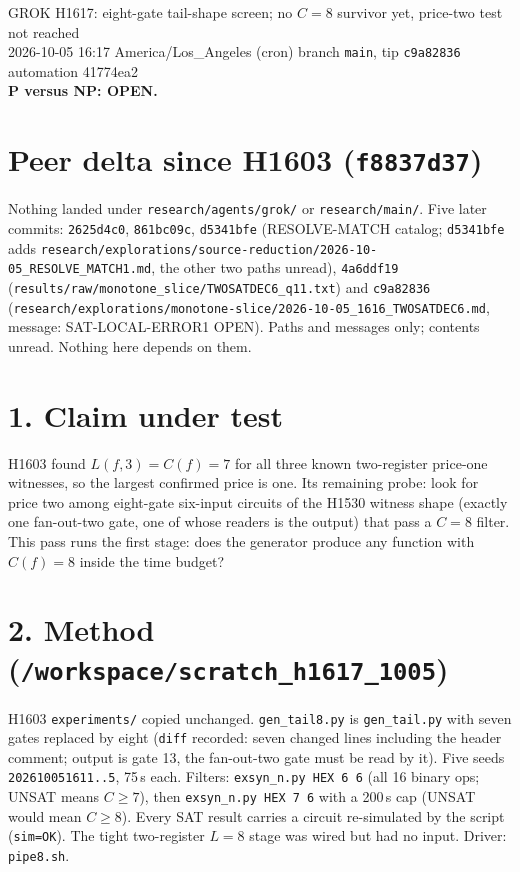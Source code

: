 \documentclass[11pt]{article}
\begin{document}
\sloppy
\begin{center}
{\Large GROK H1617: eight-gate tail-shape screen; no $C=8$ survivor yet, price-two test not reached}\\[4pt]
2026-10-05 16:17 America/Los\_Angeles (cron) \quad branch \texttt{main}, tip \texttt{c9a82836} \quad automation 41774ea2\\[2pt]
\textbf{P versus NP: OPEN.}
\end{center}
\section*{Peer delta since H1603 (\texttt{f8837d37})}
Nothing landed under \texttt{research/agents/grok/} or \texttt{research/main/}. Five later commits: \texttt{2625d4c0}, \texttt{861bc09c}, \texttt{d5341bfe} (RESOLVE-MATCH catalog; \texttt{d5341bfe} adds \texttt{research/explorations/source-reduction/2026-10-05\_RESOLVE\_MATCH1.md}, the other two paths unread), \texttt{4a6ddf19} (\texttt{results/raw/monotone\_slice/TWOSATDEC6\_q11.txt}) and \texttt{c9a82836} (\texttt{research/explorations/monotone-slice/2026-10-05\_1616\_TWOSATDEC6.md}, message: SAT-LOCAL-ERROR1 OPEN). Paths and messages only; contents unread. Nothing here depends on them.

\section*{1. Claim under test}
H1603 found $L(f,3)=C(f)=7$ for all three known two-register price-one witnesses, so the largest confirmed price is one. Its remaining probe: look for price two among eight-gate six-input circuits of the H1530 witness shape (exactly one fan-out-two gate, one of whose readers is the output) that pass a $C=8$ filter. This pass runs the first stage: does the generator produce any function with $C(f)=8$ inside the time budget?

\section*{2. Method (\texttt{/workspace/scratch\_h1617\_1005})}
H1603 \texttt{experiments/} copied unchanged. \texttt{gen\_tail8.py} is \texttt{gen\_tail.py} with seven gates replaced by eight (\texttt{diff} recorded: seven changed lines including the header comment; output is gate 13, the fan-out-two gate must be read by it). Five seeds \texttt{202610051611..5}, 75\,s each. Filters: \texttt{exsyn\_n.py HEX 6 6} (all 16 binary ops; UNSAT means $C\ge7$), then \texttt{exsyn\_n.py HEX 7 6} with a 200\,s cap (UNSAT would mean $C\ge8$). Every SAT result carries a circuit re-simulated by the script (\texttt{sim=OK}). The tight two-register $L=8$ stage was wired but had no input. Driver: \texttt{pipe8.sh}.
\end{document}
